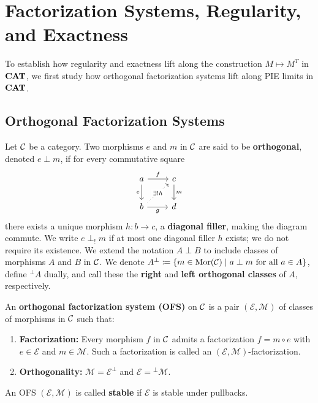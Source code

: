 
\section{Factorization Systems, Regularity, and Exactness}\label{sec:ofs}

To establish how regularity and exactness lift along the construction $M\mapsto M^T$ in $\mathbf{CAT}$, we first study how orthogonal factorization systems lift along PIE limits in $\mathbf{CAT}$.

\subsection{Orthogonal Factorization Systems}
\begin{definition}\label{def:1cat_ofs}
   Let $\mathcal{C}$ be a category. Two morphisms $e$ and $m$ in $\mathcal{C}$ are said to be \textbf{orthogonal}, denoted $e \perp m$, if for every commutative square
   \[
\begin{tikzcd}
a \arrow[d, "e"'] \arrow[r, "f"]                              & c \arrow[d, "m"] \\
b \arrow[r, "g"'] \arrow[ru, "\exists!h" description, dotted] & d
\end{tikzcd}
   \] there exists a unique morphism $h\colon b\to c$, a \textbf{diagonal filler}, making the diagram commute. We write $e\perp_! m$ if at most one diagonal filler $h$ exists; we do not require its existence. We extend the notation $A\perp B$ to include classes of morphisms $A$ and $B$ in $\mathcal{C}$. We denote $A^\perp\coloneqq \{m\in \mathrm{Mor}(\mathcal{C})\mid a\perp m\text{ for all $a\in A$}\}$, define ${}^\perp\! A$ dually, and call these the \textbf{right} and \textbf{left orthogonal classes} of $A$, respectively.

   An \textbf{orthogonal factorization system (OFS)} on $\mathcal{C}$ is a pair $(\mathcal{E}, \mathcal{M})$ of classes of morphisms in $\mathcal{C}$ such that:
   \begin{enumerate}
       \item \textbf{Factorization:} Every morphism $f$ in $\mathcal{C}$ admits a factorization $f = m \circ e$ with $e \in \mathcal{E}$ and $m \in \mathcal{M}$. Such a factorization is called an $(\mathcal{E},\mathcal{M})$-factorization.
       \item \textbf{Orthogonality:} $\mathcal{M} = \mathcal{E}^\perp$ and $\mathcal{E} = {}^\perp\! \mathcal{M}$.
   \end{enumerate}
   An OFS $(\mathcal{E},\mathcal{M})$ is called \textbf{stable} if $\mathcal{E}$ is stable under pullbacks.
\end{definition}

